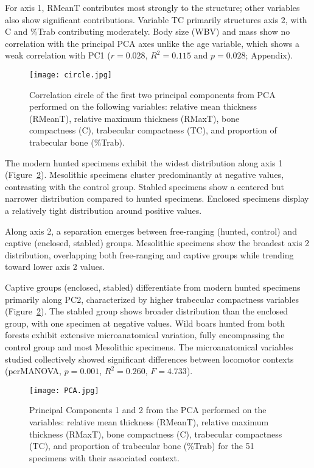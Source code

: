 \documentclass[12pt,a4paper]{article}
\begin{document}
For axis 1, RMeanT contributes most strongly to the structure; other variables also show significant contributions. Variable TC primarily structures axis 2, with C and \%Trab contributing moderately. Body size (WBV) and mass show no correlation with the principal PCA axes unlike the age variable, which shows a weak correlation with PC1 ($r = 0.028$, $R^2 = 0.115$ and $p = 0.028$; Appendix).

\begin{figure}[H]
	\texttt{[image: circle.jpg]}
	\caption{Correlation circle of the first two principal components from PCA performed on the following variables: relative mean thickness (RMeanT), relative maximum thickness (RMaxT), bone compactness (C), trabecular compactness (TC), and proportion of trabecular bone (\%Trab).}
	\label{correlation_circle}
\end{figure}

The modern hunted specimens exhibit the widest distribution along axis 1 (Figure~\ref{PCA}). Mesolithic specimens cluster predominantly at negative values, contrasting with the control group. Stabled specimens show a centered but narrower distribution compared to hunted specimens. Enclosed specimens display a relatively tight distribution around positive values.

Along axis 2, a separation emerges between free-ranging (hunted, control) and captive (enclosed, stabled) groups. Mesolithic specimens show the broadest axis 2 distribution, overlapping both free-ranging and captive groups while trending toward lower axis 2 values. 

Captive groups (enclosed, stabled) differentiate from modern hunted specimens primarily along PC2, characterized by higher trabecular compactness variables (Figure~\ref{PCA}). The stabled group shows broader distribution than the enclosed group, with one specimen at negative values. Wild boars hunted from both forests exhibit extensive microanatomical variation, fully encompassing the control group and most Mesolithic specimens.
The microanatomical variables studied collectively showed significant differences between locomotor contexts (perMANOVA, $p = 0.001$, $R^2 = 0.260$, $F = 4.733$). 

\begin{figure}[H]
	\texttt{[image: PCA.jpg]}
	\caption{Principal Components 1 and 2 from the PCA performed on the variables: relative mean thickness (RMeanT), relative maximum thickness (RMaxT), bone compactness (C), trabecular compactness (TC), and proportion of trabecular bone (\%Trab) for the 51 specimens with their associated context.}
	\label{PCA}
\end{figure}
\end{document}
